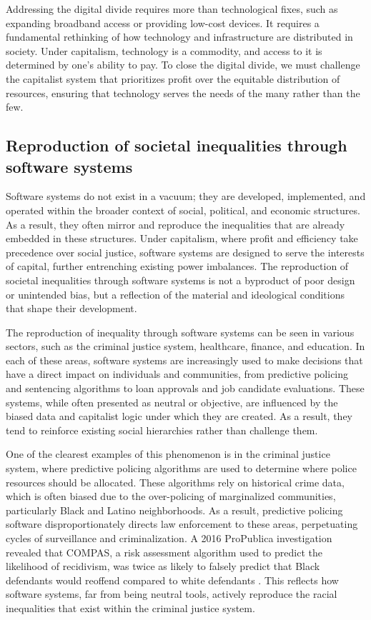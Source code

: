 Addressing the digital divide requires more than technological fixes, such as expanding broadband access or providing low-cost devices. It requires a fundamental rethinking of how technology and infrastructure are distributed in society. Under capitalism, technology is a commodity, and access to it is determined by one’s ability to pay. To close the digital divide, we must challenge the capitalist system that prioritizes profit over the equitable distribution of resources, ensuring that technology serves the needs of the many rather than the few.

\subsection{Reproduction of societal inequalities through software systems}

Software systems do not exist in a vacuum; they are developed, implemented, and operated within the broader context of social, political, and economic structures. As a result, they often mirror and reproduce the inequalities that are already embedded in these structures. Under capitalism, where profit and efficiency take precedence over social justice, software systems are designed to serve the interests of capital, further entrenching existing power imbalances. The reproduction of societal inequalities through software systems is not a byproduct of poor design or unintended bias, but a reflection of the material and ideological conditions that shape their development.

The reproduction of inequality through software systems can be seen in various sectors, such as the criminal justice system, healthcare, finance, and education. In each of these areas, software systems are increasingly used to make decisions that have a direct impact on individuals and communities, from predictive policing and sentencing algorithms to loan approvals and job candidate evaluations. These systems, while often presented as neutral or objective, are influenced by the biased data and capitalist logic under which they are created. As a result, they tend to reinforce existing social hierarchies rather than challenge them.

One of the clearest examples of this phenomenon is in the criminal justice system, where predictive policing algorithms are used to determine where police resources should be allocated. These algorithms rely on historical crime data, which is often biased due to the over-policing of marginalized communities, particularly Black and Latino neighborhoods. As a result, predictive policing software disproportionately directs law enforcement to these areas, perpetuating cycles of surveillance and criminalization. A 2016 ProPublica investigation revealed that COMPAS, a risk assessment algorithm used to predict the likelihood of recidivism, was twice as likely to falsely predict that Black defendants would reoffend compared to white defendants \cite[pp.~14-16]{angwin2016}. This reflects how software systems, far from being neutral tools, actively reproduce the racial inequalities that exist within the criminal justice system.

